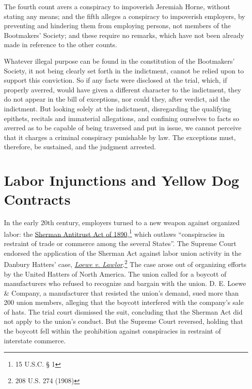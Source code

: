 \documentclass[
  letterpaper,
  11pt,
  DIV=9,
  openright]{scrbook}
\begin{document}
The fourth count avers a conspiracy to impoverish Jeremiah Horne,
without stating any means; and the fifth alleges a conspiracy to
impoverish employers, by preventing and hindering them from employing
persons, not members of the Bootmakers' Society; and these require no
remarks, which have not been already made in reference to the other
counts.

Whatever illegal purpose can be found in the constitution of the
Bootmakers' Society, it not being clearly set forth in the indictment,
cannot be relied upon to support this conviction. So if any facts were
disclosed at the trial, which, if properly averred, would have given a
different character to the indictment, they do not appear in the bill of
exceptions, nor could they, after verdict, aid the indictment. But
looking solely at the indictment, disregarding the qualifying epithets,
recitals and immaterial allegations, and confining ourselves to facts so
averred as to be capable of being traversed and put in issue, we cannot
perceive that it charges a criminal conspiracy punishable by law. The
exceptions must, therefore, be sustained, and the judgment arrested.

\section{Labor Injunctions and Yellow Dog
Contracts}\label{labor-injunctions-and-yellow-dog-contracts}

In the early 20th century, employers turned to a new weapon against
organized labor: the
\href{https://www.law.cornell.edu/uscode/text/15/1}{Sherman Antitrust
Act of 1890},\footnote{15 U.S.C. § 1} which outlaws ``conspiracies in
restraint of trade or commerce among the several States''. The Supreme
Court endorsed the application of the Sherman Act against labor union
activity in the Danbury Hatters' case,
\href{https://scholar.google.com/scholar_case?case=14933135668531662668}{\emph{Loewe
v. Lawlor}}.\footnote{208 U.S. 274 (1908)} The case arose out of
organizing efforts by the United Hatters of North America. The union
called for a boycott of manufacturers who refused to recognize and
bargain with the union. D. E. Loewe \& Company, a manufacturer that
resisted the union's demand, sued more than 200 union members, alleging
that the boycott interfered with the company's sale of hats. The trial
court dismissed the suit, concluding that the Sherman Act did not apply
to the union's conduct. But the Supreme Court reversed, holding that the
boycott fell within the prohibition against conspiracies in restraint of
interstate commerce.
\end{document}

